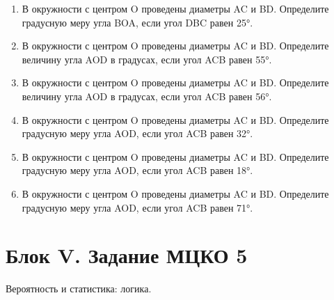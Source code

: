 \documentclass[a4paper,12pt]{article}
\newcommand{\taskspace}{\par\vspace{0.42cm}}
\newcommand{\blocknote}[1]{%
  {\color{soft}\small #1\par}\vspace{0.25cm}%
}
\begin{document}
\begin{enumerate}[resume]
\item В окружности с центром O проведены диаметры AC и BD. Определите градусную меру угла BOA, если угол DBC равен 25°.

\taskspace

\item В окружности с центром O проведены диаметры AC и BD. Определите величину угла AOD в градусах, если угол ACB равен 55°.

\taskspace

\item В окружности с центром O проведены диаметры AC и BD. Определите величину угла AOD в градусах, если угол ACB равен 56°.

\taskspace

\item В окружности с центром O проведены диаметры AC и BD. Определите градусную меру угла AOD, если угол ACB равен 32°.

\taskspace

\item В окружности с центром O проведены диаметры AC и BD. Определите градусную меру угла AOD, если угол ACB равен 18°.

\taskspace

\item В окружности с центром O проведены диаметры AC и BD. Определите градусную меру угла AOD, если угол ACB равен 71°.

\taskspace

\end{enumerate}

\newpage

\section*{Блок V. Задание МЦКО 5}

\blocknote{Вероятность и статистика: логика.}
\end{document}
